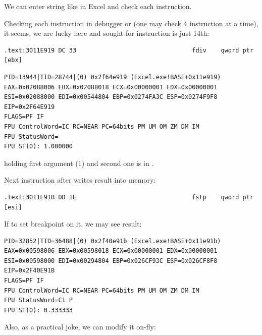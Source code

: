 {We can enter string like  in Excel and check each instruction.}

{Checking each instruction in debugger or \tracer
(one may check 4 instruction at a time),
it seems, we are lucky here and sought-for instruction is just 14th:}

\begin{lstlisting}
.text:3011E919 DC 33                                fdiv    qword ptr [ebx]
\end{lstlisting}

\begin{lstlisting}
PID=13944|TID=28744|(0) 0x2f64e919 (Excel.exe!BASE+0x11e919)
EAX=0x02088006 EBX=0x02088018 ECX=0x00000001 EDX=0x00000001
ESI=0x02088000 EDI=0x00544804 EBP=0x0274FA3C ESP=0x0274F9F8
EIP=0x2F64E919
FLAGS=PF IF
FPU ControlWord=IC RC=NEAR PC=64bits PM UM OM ZM DM IM 
FPU StatusWord=
FPU ST(0): 1.000000
\end{lstlisting}

{\STZERO holding first argument (1) and second one is in} \TT{[ebx]}.

{Next instruction after \FDIV writes result into memory:}

\begin{lstlisting}
.text:3011E91B DD 1E                                fstp    qword ptr [esi]
\end{lstlisting}

{If to set breakpoint on it, we may see result:}

\begin{lstlisting}
PID=32852|TID=36488|(0) 0x2f40e91b (Excel.exe!BASE+0x11e91b)
EAX=0x00598006 EBX=0x00598018 ECX=0x00000001 EDX=0x00000001
ESI=0x00598000 EDI=0x00294804 EBP=0x026CF93C ESP=0x026CF8F8
EIP=0x2F40E91B
FLAGS=PF IF
FPU ControlWord=IC RC=NEAR PC=64bits PM UM OM ZM DM IM 
FPU StatusWord=C1 P 
FPU ST(0): 0.333333
\end{lstlisting}

{Also, as a practical joke, we can modify it on-fly:}

